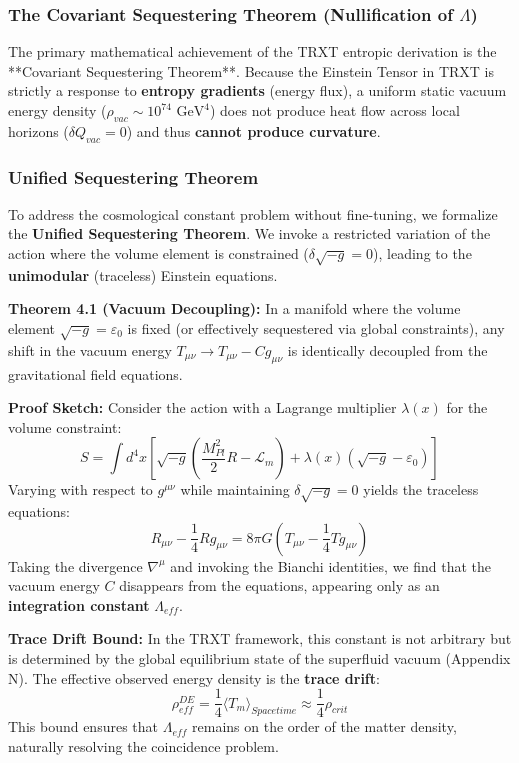 \documentclass[a4paper,12pt]{article}
\begin{document}
\subsubsection{The Covariant Sequestering Theorem (Nullification of $\Lambda$)}
The primary mathematical achievement of the TRXT entropic derivation is the **Covariant Sequestering Theorem**. Because the Einstein Tensor in TRXT is strictly a response to \textbf{entropy gradients} (energy flux), a uniform static vacuum energy density ($\rho_{vac} \sim 10^{74} \text{ GeV}^4$) does not produce heat flow across local horizons ($\delta Q_{vac} = 0$) and thus \textbf{cannot produce curvature}. 

\subsubsection{Unified Sequestering Theorem}

To address the cosmological constant problem without fine-tuning, we formalize the \textbf{Unified Sequestering Theorem}. We invoke a restricted variation of the action where the volume element is constrained ($\delta \sqrt{-g} = 0$), leading to the \textbf{unimodular} (traceless) Einstein equations.

\textbf{Theorem 4.1 (Vacuum Decoupling):}
In a manifold where the volume element $\sqrt{-g} = \varepsilon_0$ is fixed (or effectively sequestered via global constraints), any shift in the vacuum energy $T_{\mu\nu} \to T_{\mu\nu} - C g_{\mu\nu}$ is identically decoupled from the gravitational field equations.

\textbf{Proof Sketch:}
Consider the action with a Lagrange multiplier $\lambda(x)$ for the volume constraint:
\begin{equation}
    S = \int d^4x \left[ \sqrt{-g} \left( \frac{M_{Pl}^2}{2} R - \mathcal{L}_m \right) + \lambda(x)(\sqrt{-g} - \varepsilon_0) \right]
\end{equation}
Varying with respect to $g^{\mu\nu}$ while maintaining $\delta \sqrt{-g} = 0$ yields the traceless equations:
\begin{equation}
    R_{\mu\nu} - \frac{1}{4} R g_{\mu\nu} = 8\pi G \left( T_{\mu\nu} - \frac{1}{4} T g_{\mu\nu} \right)
\end{equation}
Taking the divergence $\nabla^\mu$ and invoking the Bianchi identities, we find that the vacuum energy $C$ disappears from the equations, appearing only as an \textbf{integration constant} $\Lambda_{eff}$.

\textbf{Trace Drift Bound:}
In the TRXT framework, this constant is not arbitrary but is determined by the global equilibrium state of the superfluid vacuum (Appendix N). The effective observed energy density is the \textbf{trace drift}:
\begin{equation}
    \rho_{eff}^{DE} = \frac{1}{4} \langle T_m \rangle_{Spacetime} \approx \frac{1}{4} \rho_{crit}
\end{equation}
This bound ensures that $\Lambda_{eff}$ remains on the order of the matter density, naturally resolving the coincidence problem.
\end{document}
